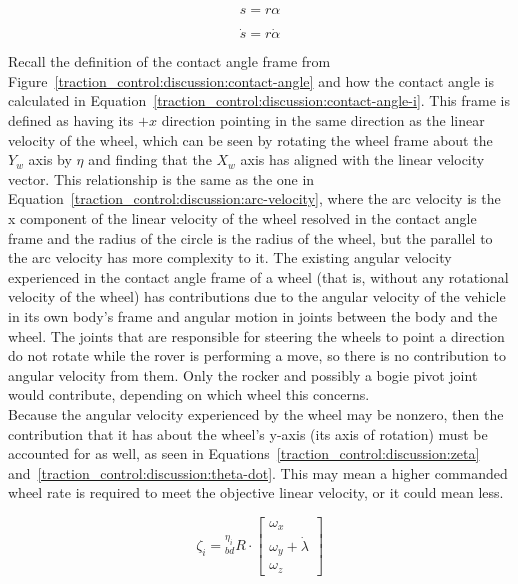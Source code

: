 \begin{equation}\label{traction_control:discussion:arc-length}
	s = r \alpha
\end{equation}

\begin{equation}\label{traction_control:discussion:arc-velocity}
	\dot{s} = r \dot{\alpha}
\end{equation}

Recall the definition of the contact angle frame from Figure~\ref{traction_control:discussion:contact-angle} and how the contact angle is calculated in Equation~\ref{traction_control:discussion:contact-angle-i}. This frame is defined as having its $+x$ direction pointing in the same direction as the linear velocity of the wheel, which can be seen by rotating the wheel frame about the $Y_{w}$ axis by $\eta$ and finding that the $X_{w}$ axis has aligned with the linear velocity vector. This relationship is the same as the one in Equation~\ref{traction_control:discussion:arc-velocity}, where the arc velocity is the x component of the linear velocity of the wheel resolved in the contact angle frame and the radius of the circle is the radius of the wheel, but the parallel to the arc velocity has more complexity to it. The existing angular velocity experienced in the contact angle frame of a wheel (that is, without any rotational velocity of the wheel) has contributions due to the angular velocity of the vehicle in its own body's frame and angular motion in joints between the body and the wheel. The joints that are responsible for steering the wheels to point a direction do not rotate while the rover is performing a move, so there is no contribution to angular velocity from them. Only the rocker and possibly a bogie pivot joint would contribute, depending on which wheel this concerns. \\

Because the angular velocity experienced by the wheel may be nonzero, then the contribution that it has about the wheel's y-axis (its axis of rotation) must be accounted for as well, as seen in Equations~\ref{traction_control:discussion:zeta} and~\ref{traction_control:discussion:theta-dot}. This may mean a higher commanded wheel rate is required to meet the objective linear velocity, or it could mean less.

\begin{equation}\label{traction_control:discussion:zeta}
	\zeta_{i} = {}^{\eta_{i}}_{bd}R \cdot \left[\begin{array}{c}
		\omega_{x} \\
		\omega_{y} + \dot{\lambda} \\
		\omega_{z}
	\end{array}\right]
\end{equation}

